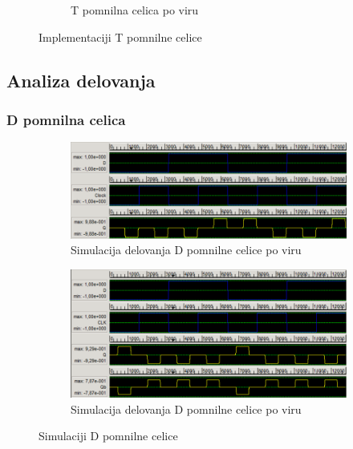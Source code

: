 \documentclass[a4paper, 11pt]{article}
\begin{document}
\begin{figure}[h!]
\begin{subfigure}[b]{0.4\textwidth}
	\caption{T pomnilna celica po viru \cite{a_novel_approach}}
	\label{fig-t-2}
	\end{subfigure}
	\caption{Implementaciji T pomnilne celice}
	\label{fig-t}
\end{figure}


\subsection{Analiza delovanja}
\subsubsection{D pomnilna celica}
\begin{figure}[h!]
	\begin{subfigure}[b]{\textwidth}
	\includegraphics[width=\textwidth]{../img/vir_4/sim_d.png}
	\caption{Simulacija delovanja D pomnilne celice po viru \cite{quantum_dot}}
	\label{fig-d-1-sim}
	\end{subfigure}
	\begin{subfigure}[b]{\textwidth}
	\includegraphics[width=\textwidth]{../img/vir_5/sim_d.png}
	\caption{Simulacija delovanja D pomnilne celice po viru \cite{a_novel_approach}}
	\label{fig-d-2-sim}
	\end{subfigure}
	\caption{Simulaciji D pomnilne celice}
	\label{fig-d-sim}
\end{figure}
\end{document}
